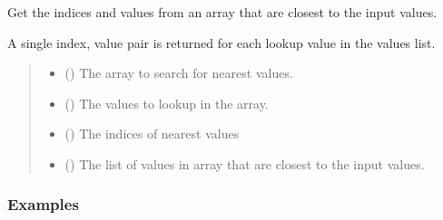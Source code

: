 \documentclass[letterpaper,10pt,english]{sphinxmanual}
\begin{document}
\begin{fulllineitems}
\label{\detokenize{misc:glomar_gridding.utils.find_nearest}}
\pysigstartsignatures
\pysiglinewithargsret
{}
{\sphinxparamcomma {}}
{}
\pysigstopsignatures
\sphinxAtStartPar
Get the indices and values from an array that are closest to the input
values.

\sphinxAtStartPar
A single index, value pair is returned for each look\sphinxhyphen{}up value in the values
list.
\begin{quote}\begin{description}
\begin{itemize}
\item {}
\sphinxAtStartPar
{} () \textendash{} The array to search for nearest values.

\item {}
\sphinxAtStartPar
{} () \textendash{} The values to look\sphinxhyphen{}up in the array.

\end{itemize}

\sphinxAtStartPar
{}

\sphinxAtStartPar
\begin{itemize}
\item {}
\sphinxAtStartPar
{} () \textendash{} The indices of nearest values

\item {}
\sphinxAtStartPar
{} () \textendash{} The list of values in array that are closest to the input values.

\end{itemize}


\end{description}\end{quote}
\subsubsection*{Examples}


\end{fulllineitems}
\end{document}
